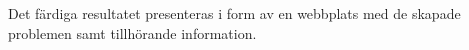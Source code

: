 \textcolor{lila}{Det färdiga resultatet presenteras i form av en webbplats med de skapade problemen samt tillhörande information.} 